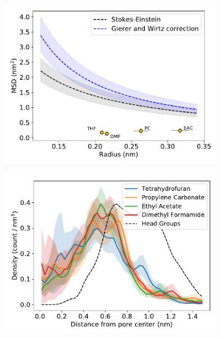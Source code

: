 \documentclass[journal=jpcbfk,manuscript=article]{achemso}
\begin{document}
  \begin{figure}[!htb]
  \centering
  \begin{subfigure}{0.325\textwidth}
  \includegraphics[width=\textwidth]{msd_radius_nondonors_10wt.pdf}
  \caption{}\label{fig:nondonors_rdf}
  \end{subfigure}
  \begin{subfigure}{0.325\textwidth}
  \includegraphics[width=\textwidth]{nondonors_rdf.pdf}
  \caption{}\label{fig:nondonors_rdf}
  \end{subfigure}
  \begin{subfigure}{0.325\textwidth}

\end{subfigure}
\end{figure}
\end{document}
